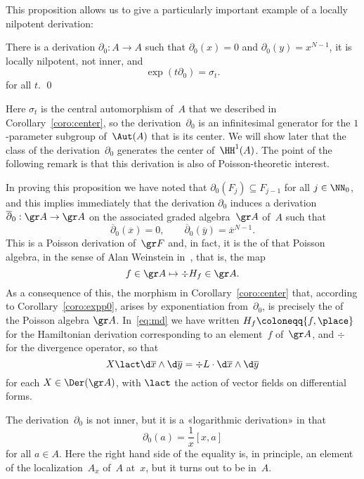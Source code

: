This proposition allows us to give a particularly important example of a
locally nilpotent derivation:

\begin{Corollary}\label{coro:expp0}
There is a derivation $\partial_0:A\to A$ such that $\partial_0(x)=0$ and
$\partial_0(y)=x^{N-1}$, it is locally nilpotent, not inner, and
  \[ \label{eq:expp0}
  \exp(t\partial_0) = \sigma_t.
  \]
for all $t$. \qed
\end{Corollary}

Here $\sigma_t$ is the central automorphism of~$A$ that we described in
Corollary~\ref{coro:center}, so the derivation~$\partial_0$ is an
infinitesimal generator for the $1$-parameter subgroup of~$\Aut(A)$ that is
its center. We will show later that the class of the
derivation~$\partial_0$ generates the center of~$\HH^1(A)$. The point of
the following remark is that this derivation is also of Poisson-theoretic
interest.

\begin{Remark}\label{rem:modular}
In proving this proposition we have noted that $\partial_0(F_j)\subseteq
F_{j-1}$ for all $j\in\NN_0$, and this implies immediately that the
derivation $\partial_0$ induces a derivation $\overline\partial_0:\gr
A\to\gr A$ on the associated graded algebra~$\gr A$ of~$A$ such that
  \[
  \overline\partial_0(\overline x)=0,
  \qquad
  \overline\partial_0(\overline y)=\overline x^{N-1}.
  \]
This is a Poisson derivation of~$\gr F$ and, in fact, it is the
 of that Poisson algebra, in the sense of Alan
Weinstein in~\cite{Weinstein}, that is, the map
  \[ \label{eq:md}
  f\in\gr A\mapsto \div H_f\in\gr A.
  \]
As a consequence of this, the morphism in Corollary~\ref{coro:center} that,
according to Corollary~\ref{coro:expp0}, arises by exponentiation
from~$\partial_0$, is precisely the  of the Poisson
algebra $\gr A$. In~\eqref{eq:md} we have written
$H_f\coloneqq\{f,\place\}$ for the Hamiltonian derivation corresponding to
an element~$f$ of~$\gr A$, and $\div$ for the divergence operator, so that 
  \[
  X\lact\d\overline x\wedge\d\overline y 
        = \div L\cdot\d\overline x\wedge\d\overline y
  \]
for each $X\in\Der(\gr A)$, with $\lact$ the action of vector fields on
differential forms.
\end{Remark}

\begin{Remark}
The derivation~$\partial_0$ is not inner, but it is a «logarithmic
derivation» in that
  \[
  \partial_0(a) = \frac{1}{x}[x,a]
  \]
for all $a\in A$. Here the right hand side of the equality is, in
principle, an element of the localization~$A_x$ of~$A$ at~$x$, but it turns
out to be in~$A$.
\end{Remark}

